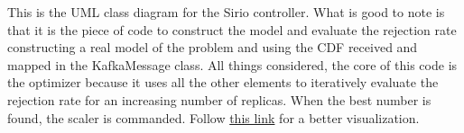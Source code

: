 This is the UML class diagram for the Sirio controller. What is good to note is that it is the piece of code to construct the model and evaluate the rejection rate constructing a real model of the problem and using the CDF received and mapped in the KafkaMessage class. All things considered, the core of this code is the optimizer because it uses all the other elements to iteratively evaluate the rejection rate for an increasing number of replicas. When the best number is found, the scaler is commanded. Follow \href{https://lucid.app/lucidchart/5c1b70c3-c1c8-470e-b04a-fefab525a1fc/edit?invitationId=inv_05163187-b3ea-4a1a-a14b-3cdabad1d3d5&page=XRAN4fSOEXo6#}{this link} for a better visualization.
